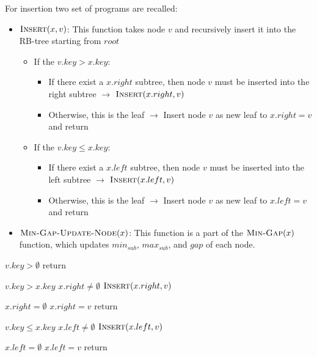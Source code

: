 \documentclass[11pt]{article}
\begin{document}
\begin{enumerate}
	For insertion two set of programs are recalled:
	\begin{itemize}
		\item $\textnormal{\scshape Insert}(x,v)$: This function takes node $v$ and recursively insert it into the RB-tree starting from $root$
		\begin{itemize}
			\item If the $v.key>x.key$: 
			\begin{itemize}
				\item If there exist a $x.right$ subtree, then node $v$ must be inserted into the right subtree $\rightarrow$	$\textnormal{\scshape Insert}(x.right,v)$
				\item Otherwise, this is the leaf $\rightarrow$ Insert node $v$ as new leaf to $x.right=v$ and return
			\end{itemize}
			\item If the $v.key\leq x.key$: 
			\begin{itemize}
				\item If there exist a $x.left$ subtree, then node $v$ must be inserted into the left subtree $\rightarrow$	$\textnormal{\scshape Insert}(x.left,v)$
				\item Otherwise, this is the leaf $\rightarrow$ Insert node $v$ as new leaf to $x.left=v$ and return
			\end{itemize}

		\end{itemize}

		\item $\textnormal{\scshape Min-Gap-Update-Node}(x)$: This function is a part of the $\textnormal{\scshape Min-Gap}(x)$ function, which updates $min_{sub}$, $max_{sub}$, and $gap$ of each node.  
	\end{itemize}


	
	\begin{codebox}

	 	\li \If $v.key>\emptyset$
		 	\li \Do 
			 	return
			\End


	 	\li \If $v.key>x.key$
		 	\Do 
		 	\li \If $x.right\neq \emptyset$
			 	\li \Do 
				 	$\textnormal{\scshape Insert}(x.right,v)$
						 	
		 	\li \ElseIf $x.right= \emptyset$
			 	\li \Do 
				 	$x.right=v$
				 	\li return
				\End
			\End
		
	 	\li \If $v.key\leq x.key$
		 	\Do 
		 	\li \If $x.left\neq \emptyset$
			 	\li \Do 
				 	$\textnormal{\scshape Insert}(x.left,v)$
						 	
		 	\li \ElseIf $x.left= \emptyset$
			 	\li \Do 
				 	$x.left=v$
				 	\li return
				\End
			\End
			

\end{codebox}
\end{enumerate}
\end{document}
